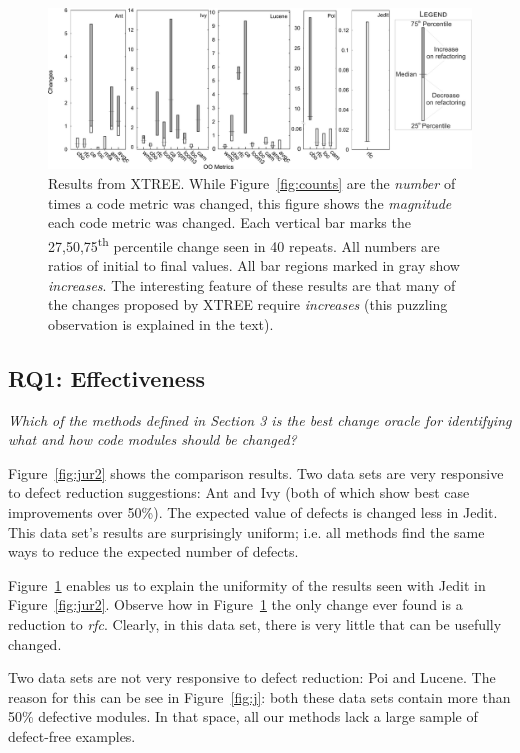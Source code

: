 \documentclass[twocolumn,5p]{elsarticle}
\newcommand{\fig}[1]{Figure~\ref{fig:#1}}
\theoremstyle{break}
\begin{document}
	\begin{figure}[!t]
		\centering
		\includegraphics[width=\linewidth]{changes01}
		\caption{Results  from XTREE.
			While \fig{counts} are the {\em number} of times a code metric was 
			changed,
			this  figure shows the {\em magnitude} each code metric was 
			changed. Each vertical bar
			marks the 27,50,75\textsuperscript{th} percentile change seen in 40 
			repeats.
			All numbers are ratios of initial to final values.
			All bar regions marked in gray show {\em increases}.
			The interesting feature of these results are that many
			of the changes proposed by XTREE require {\em increases}
			(this puzzling observation is explained in the text).}
		\label{fig:changes}
	\end{figure}
	
	
	
	\subsection{RQ1: Effectiveness}
	
	{\em Which of the methods defined in Section 3 is the best change oracle 
	for identifying what and how code modules should be changed? }
	
	\fig{jur2} shows the comparison results.
	Two data sets are very responsive to defect reduction suggestions:
	Ant and Ivy (both of which show best case improvements over 50\%).
	The  expected value of defects
	is changed less in Jedit. This data set's results are
	surprisingly uniform; i.e.   all methods
	find the same ways to reduce the expected number of
	defects.
	
	\fig{changes} enables us to explain the uniformity
	of the results seen with Jedit in \fig{jur2}.
	Observe how in \fig{changes} the only change ever
	found is a reduction to {\em rfc}. Clearly, in this
	data set, there is very little that can be usefully changed.
	
	Two data sets are not very responsive to defect reduction:
	Poi and Lucene. The reason for this can be see in \fig{j}:
	both these data sets contain more than 50\% defective modules.
	In that space, all our  methods lack a large sample of
	defect-free examples.
	
\end{document}
